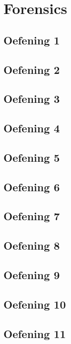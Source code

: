 \documentclass[a4paper,11pt]{report}
\begin{document}
\chapter{Forensics}
\section{Oefening 1}

\section{Oefening 2}

\section{Oefening 3}

\section{Oefening 4}

\section{Oefening 5}

\section{Oefening 6}

\section{Oefening 7}

\section{Oefening 8}

\section{Oefening 9}

\section{Oefening 10}

\section{Oefening 11}

\end{document}
